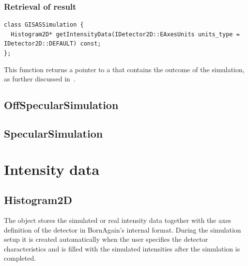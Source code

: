 \subsubsection{Retrieval of result}
\begin{lstlisting}
class GISASSimulation {
  Histogram2D* getIntensityData(IDetector2D::EAxesUnits units_type = IDetector2D::DEFAULT) const;
};
\end{lstlisting}
%
This function returns a pointer to a 
that contains the outcome of the simulation,
as further discussed in~.

\subsection{Off\-Specular\-Simulation}

\MissingSection

\subsection{Specular\-Simulation}

\MissingSection

\section{Intensity data}

\MissingSection
\iffalse

\subsection{Histogram2D}\label{SRefHis2D}


The  object stores the
simulated or real intensity data together with the axes definition of the detector in BornAgain's internal format.
During the simulation setup
it is created automatically when the user specifies the detector characteristics and is filled with the simulated intensities after the simulation is completed.

